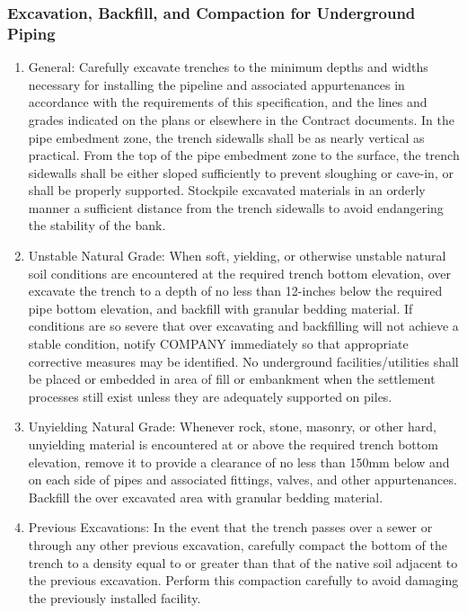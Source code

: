 \documentclass{article}%
\begin{document}
\subsubsection{Excavation, Backfill, and Compaction for Underground Piping}%
\label{ssubsec:Excavation,Backfill,andCompactionforUndergroundPiping}%
\begin{enumerate}[label=\alph*),start=1]%
\item%
General: Carefully excavate trenches to the minimum depths and widths necessary for installing the pipeline and associated appurtenances in accordance with the requirements of this specification, and the lines and grades indicated on the plans or elsewhere in the Contract documents. In the pipe embedment zone, the trench sidewalls shall be as nearly vertical as practical. From the top of the pipe embedment zone to the surface, the trench sidewalls shall be either sloped sufficiently to prevent sloughing or cave{-}in, or shall be properly supported. Stockpile excavated materials in an orderly manner a sufficient distance from the trench sidewalls to avoid endangering the stability of the bank.%
\item%
Unstable Natural Grade: When soft, yielding, or otherwise unstable natural soil conditions are encountered at the required trench bottom elevation, over excavate the trench to a depth of no less than 12{-}inches below the required pipe bottom elevation, and backfill with granular bedding material. If conditions are so severe that over excavating and backfilling will not achieve a stable condition, notify COMPANY immediately so that appropriate corrective measures may be identified. No underground facilities/utilities shall be placed or embedded in area of fill or embankment when the settlement processes still exist unless they are adequately supported on piles.%
\item%
Unyielding Natural Grade: Whenever rock, stone, masonry, or other hard, unyielding material is encountered at or above the required trench bottom elevation, remove it to provide a clearance of no less than 150mm below and on each side of pipes and associated fittings, valves, and other appurtenances. Backfill the over excavated area with granular bedding material.%
\item%
Previous Excavations: In the event that the trench passes over a sewer or through any other previous excavation, carefully compact the bottom of the trench to a density equal to or greater than that of the native soil adjacent to the previous   excavation.   Perform   this   compaction   carefully   to   avoid damaging the previously installed facility.%

\end{enumerate}
\end{document}
